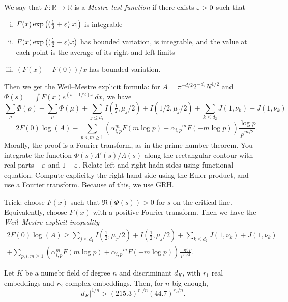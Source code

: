 \documentclass[reqno]{amsart} 
\begin{document}
\begin{definition}
  We say that $F : \mathbb{R} \rightarrow \mathbb{R}$ is a \emph{Mestre test function} if there exists $\varepsilon > 0$ such that
  \begin{enumerate}[(i)]
  \item $F(x) \exp \left((\tfrac{1}{2} + \varepsilon) \lvert x \rvert \right)$ is integrable
  \item $F(x) \exp \left((\tfrac{1}{2} + \varepsilon) x \right)$ has bounded variation, is integrable, and the value at each point is the average of its right and left limits
  \item $(F(x) - F(0)) / x$ has bounded variation.
  \end{enumerate}
\end{definition}
Then  we get the Weil--Mestre explicit formula: for $A = \pi^{- d/2} 2^{- d_2} N^{1/2}$
and $\Phi(s) = \int F(x) e^{(s - 1/2)x}\, d x$, we have
\begin{equation*}
  \sum_\rho \Phi(\rho) - \sum_\mu \Phi(\mu) + \sum_{j \leq d_1}
  I(\tfrac{1}{2}, \mu_j /2) + I(1/2, \overline{\mu_j}/ 2)
  + \sum_{k \leq d_2} J(1, \nu_k) + J(1, \overline{\nu_k})
\end{equation*}
\begin{equation*}
  = 2 F(0) \log(A) - \sum_{p, i, m \geq 1}
  \left( \alpha_{i, p}^m F(m \log p)
    + \overline{\alpha_{i, p}}
    ^m F(- m \log p)
  \right)
  \frac{\log p}{ p^{m/2}}.
\end{equation*}
Morally, the proof is a Fourier transform, as in the prime number theorem.  You integrate the function $\Phi(s) \Lambda '(s) / \Lambda(s)$ along the rectangular contour with real parts $- \varepsilon$ and $1 + \varepsilon$.  Relate left and right hadn sides using functional equation.  Compute explicitly the right hand side using the Euler product, and use a Fourier transform.  Because of this, we use GRH.

Trick: choose $F(x)$ such that $\Re(\Phi(s)) > 0$ for $s$ on the critical line.  Equivalently, choose $F(x)$ with a positive Fourier transform.  Then we have the \emph{Weil--Mestre explicit inequality}
\begin{multline*}
  2 F(0) \log(A) \geq \sum_{j \leq d_1}
  I(\tfrac{1}{2}, \mu_j /2)
  + I(\tfrac{1}{2}, \overline{\mu_j}/2)
  + \sum_{k \leq d_2} J(1, \nu_k) + J(1, \overline{\nu_k}) \\
  + \sum_{p, i, m \geq 1} \left( \alpha_{i, p}^m F(m \log p) +
    \overline{\alpha_{i, p}}^m F(- m \log p)\right)
  \frac{\log p}{p^{m/2}}.
\end{multline*}
\begin{theorem}
  Let $K$ be a numebr field of degree $n$ and discriminant $d_K$, with $r_1$ real embeddings and $r_2$ complex embeddings.  Then, for $n$ big enough,
  \begin{equation*}
    \lvert d_K \rvert^{1/n} >(215.3)^{r_1 / n}(44.7)^{r_2 /n}.
  \end{equation*}
\end{theorem}
\end{document}

